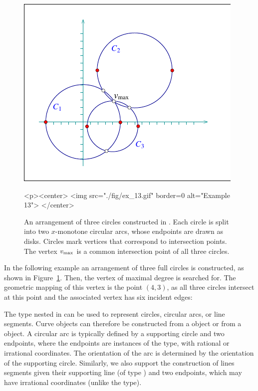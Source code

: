 \begin{figure}[t]
\begin{ccTexOnly}
  \begin{center}
  \includegraphics{Arrangement_on_surface_2/fig/ex_13}
  \end{center}
\end{ccTexOnly}
\begin{ccHtmlOnly}
  <p><center>
  <img src="./fig/ex_13.gif" border=0 alt="Example 13">
  </center>
\end{ccHtmlOnly}
\caption{An arrangement of three circles constructed in
. Each circle is split into two $x$-monotone
circular arcs, whose endpoints are drawn as disks. Circles
mark vertices that correspond to intersection points. The vertex
$v_{\rm max}$ is a common intersection point of all three
circles.\label{arr_fig:ex_13}}
\end{figure}

In the following example an arrangement of three full circles is
constructed, as shown in Figure~\ref{arr_fig:ex_13}. Then, the vertex
of maximal degree is searched for. The geometric mapping of this
vertex is the point $(4,3)$, as all three circles intersect at this point
and the associated vertex has six incident edges:


The  type nested in  can be
used to represent circles, circular arcs, or line segments. Curve objects
can therefore be constructed from a  object or from
a  object. A circular arc is typically defined by
a supporting circle and two endpoints, where the endpoints are instances
of the  type, with rational or irrational coordinates. The
orientation of the arc is determined by the orientation of the supporting
circle. Similarly, we also support the construction of lines segments given
their supporting line (of type ) and two endpoints, which
may have irrational coordinates (unlike the  type).

